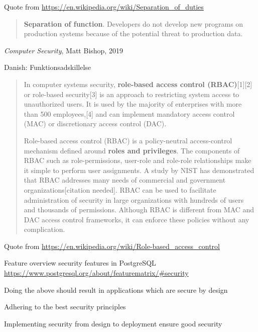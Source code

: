 \documentclass[Screen16to9,17pt]{foils}
\begin{document}
Quote from \url{https://en.wikipedia.org/wiki/Separation_of_duties}

\begin{quote}
{\bf Separation of function}. Developers do not develop new programs on production systems because of the potential threat to production data.
\end{quote}
\emph{Computer Security}, Matt Bishop, 2019

Danish: Funktionsadskillelse



\begin{quote}
In computer systems security, {\bf role-based access control (RBAC)}[1][2] or role-based security[3] is an approach to restricting system access to unauthorized users. It is used by the majority of enterprises with more than 500 employees,[4] and can implement mandatory access control (MAC) or discretionary access control (DAC).

Role-based access control (RBAC) is a policy-neutral access-control mechanism defined around {\bf roles and privileges}. The components of RBAC such as role-permissions, user-role and role-role relationships make it simple to perform user assignments. A study by NIST has demonstrated that RBAC addresses many needs of commercial and government organizations[citation needed]. RBAC can be used to facilitate administration of security in large organizations with hundreds of users and thousands of permissions. Although RBAC is different from MAC and DAC access control frameworks, it can enforce these policies without any complication.
\end{quote}
Quote from \url{https://en.wikipedia.org/wiki/Role-based_access_control}




Feature overview security features in PostgreSQL\\
\url{https://www.postgresql.org/about/featurematrix/#security}



\begin{list2}
\item Doing the above should result in applications which are secure by design
\item Adhering to the best security principles
\item Implementing security from design to deployment ensure good security
\end{list2}
\end{document}
